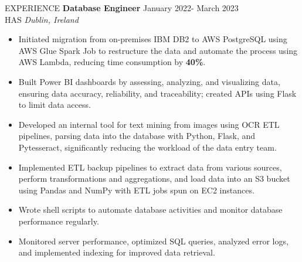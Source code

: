 \documentclass{resume} %
\begin{document}
\begin{rSection}{EXPERIENCE}
\textbf{Database Engineer} \hfill  January 2022- March 2023\\
HAS \hfill \textit{Dublin, Ireland}
\begin{itemize}
    \itemsep -3pt {}
    \item Initiated migration from on-premises IBM DB2 to AWS PostgreSQL using AWS Glue Spark Job to restructure the data and automate the process using AWS Lambda, reducing time consumption by \textbf{40\%}.
    \item Built Power BI dashboards by assessing, analyzing, and visualizing data, ensuring data accuracy, reliability, and traceability; created APIs using Flask to limit data access.
    \item Developed an internal tool for text mining from images using OCR ETL pipelines, parsing data into the database with Python, Flask, and Pytesseract, significantly reducing the workload of the data entry team.
    \item Implemented ETL backup pipelines to extract data from various sources, perform transformations and aggregations, and load data into an S3 bucket using Pandas and NumPy with ETL jobs spun on EC2 instances.
    \item Wrote shell scripts to automate database activities and monitor database performance regularly.
    \item Monitored server performance, optimized SQL queries, analyzed error logs, and implemented indexing for improved data retrieval.
\end{itemize}



\end{rSection}
\end{document}
